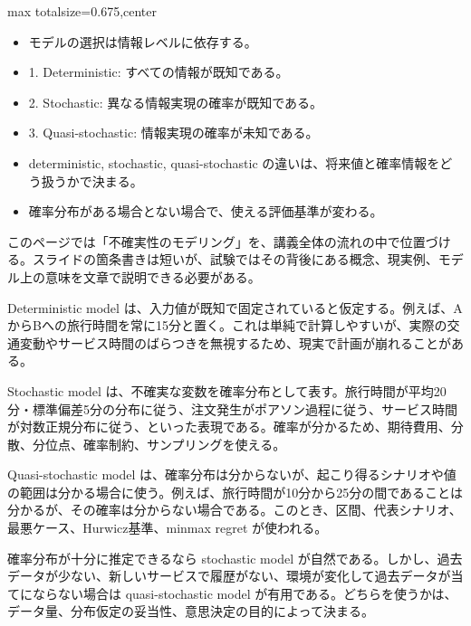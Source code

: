 \clearpage
{}
\begin{adjustbox}{max totalsize={\textwidth}{0.675\textheight},center}
\begin{minipage}{\textwidth}\scriptsize
\begin{minipage}[t]{0.485\textwidth}
\begin{itemize}
\item モデルの選択は情報レベルに依存する。
\item 1. Deterministic: すべての情報が既知である。
\item 2. Stochastic: 異なる情報実現の確率が既知である。
\item 3. Quasi-stochastic: 情報実現の確率が未知である。
\end{itemize}
\begin{itemize}
\item deterministic, stochastic, quasi-stochastic の違いは、将来値と確率情報をどう扱うかで決まる。
\item 確率分布がある場合とない場合で、使える評価基準が変わる。
\end{itemize}
\end{minipage}\hfill
\begin{minipage}[t]{0.485\textwidth}
このページでは「不確実性のモデリング」を、講義全体の流れの中で位置づける。スライドの箇条書きは短いが、試験ではその背後にある概念、現実例、モデル上の意味を文章で説明できる必要がある。\par
Deterministic model は、入力値が既知で固定されていると仮定する。例えば、AからBへの旅行時間を常に15分と置く。これは単純で計算しやすいが、実際の交通変動やサービス時間のばらつきを無視するため、現実で計画が崩れることがある。\par
Stochastic model は、不確実な変数を確率分布として表す。旅行時間が平均20分・標準偏差5分の分布に従う、注文発生がポアソン過程に従う、サービス時間が対数正規分布に従う、といった表現である。確率が分かるため、期待費用、分散、分位点、確率制約、サンプリングを使える。\par
Quasi-stochastic model は、確率分布は分からないが、起こり得るシナリオや値の範囲は分かる場合に使う。例えば、旅行時間が10分から25分の間であることは分かるが、その確率は分からない場合である。このとき、区間、代表シナリオ、最悪ケース、Hurwicz基準、minmax regret が使われる。\par
確率分布が十分に推定できるなら stochastic model が自然である。しかし、過去データが少ない、新しいサービスで履歴がない、環境が変化して過去データが当てにならない場合は quasi-stochastic model が有用である。どちらを使うかは、データ量、分布仮定の妥当性、意思決定の目的によって決まる。\par

\end{minipage}
\end{minipage}
\end{adjustbox}
